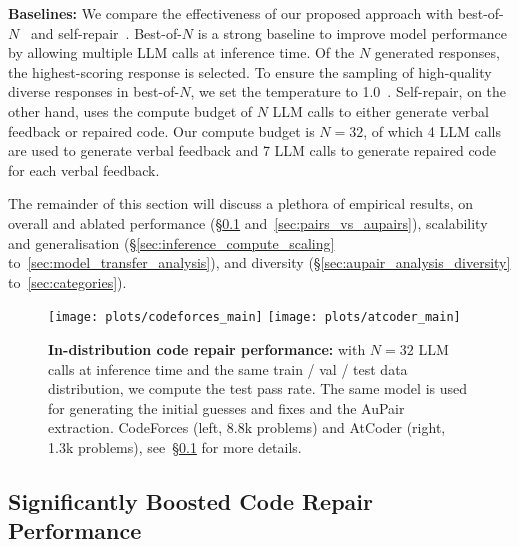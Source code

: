 \documentclass[11pt, a4paper, logo, copyright]{googledeepmind}
\def\aupair/{\textcolor{golden}{Au}Pair}
\begin{document}
\textbf{Baselines:} We compare the effectiveness of our proposed approach with best-of-$N$~\citep{best-of-n} and self-repair~\citep{olausson2024self}. Best-of-$N$ is a strong baseline to improve model performance by allowing multiple LLM calls at inference time. Of the $N$ generated responses, the highest-scoring response is selected. To ensure the sampling of high-quality diverse responses in best-of-$N$, we set the temperature to 1.0~\citep{temperature}. Self-repair, on the other hand, uses the compute budget of $N$ LLM calls to either generate verbal feedback or repaired code. Our compute budget is $N = 32$, of which 4 LLM calls are used to generate verbal feedback and 7 LLM calls to generate repaired code for each verbal feedback.

The remainder of this section will discuss a plethora of empirical results, on overall and ablated performance (\S\ref{sec:in_dist_performance} and~\ref{sec:pairs_vs_aupairs}), scalability and generalisation (\S\ref{sec:inference_compute_scaling} to~\ref{sec:model_transfer_analysis}), and diversity (\S\ref{sec:aupair_analysis_diversity} to~\ref{sec:categories}).


\begin{figure}[t]
    \centering
    \texttt{[image: plots/codeforces\_main]}
    \texttt{[image: plots/atcoder\_main]}
    \caption{\textbf{In-distribution code repair performance:} with $N = 32$ LLM calls at inference time and the same train / val / test data distribution, we compute the test pass rate. The same model is used for generating the initial guesses and fixes and the \aupair/ extraction. CodeForces (left, 8.8k problems) and AtCoder (right, 1.3k problems), see~\S\ref{sec:in_dist_performance} for more details.}
    \label{fig:in_dist_performance}
\end{figure}


\subsection{Significantly Boosted Code Repair Performance}
\label{sec:in_dist_performance}
\end{document}
